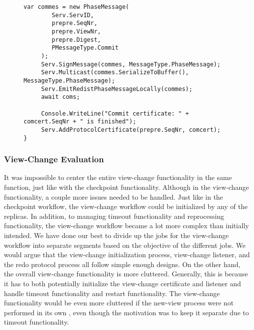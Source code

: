 \begin{figure}[H]
\begin{lstlisting}[label = code:redoprotocol, caption=Redo Protocol Functionality, captionpos = b, basicstyle=\scriptsize]
     var commes = new PhaseMessage(
        Serv.ServID, 
        prepre.SeqNr, 
        prepre.ViewNr, 
        prepre.Digest, 
        PMessageType.Commit
     );
     Serv.SignMessage(commes, MessageType.PhaseMessage);
     Serv.Multicast(commes.SerializeToBuffer(), MessageType.PhaseMessage);
     Serv.EmitRedistPhaseMessageLocally(commes);
     await coms;
     
     Console.WriteLine("Commit certificate: " + comcert.SeqNr + " is finished");
     Serv.AddProtocolCertificate(prepre.SeqNr, comcert);
}
	\end{lstlisting}
\end{figure}

\subsubsection{View-Change Evaluation}
It was impossible to center the entire view-change functionality in the same function, just like with the checkpoint functionality. Although in the view-change functionality, a couple more issues needed to be handled. Just like in the checkpoint workflow, the view-change workflow could be initialized by any of the replicas. In addition, to managing timeout functionality and reprocessing functionality, the view-change workflow became a lot more complex than initially intended. We have done our best to divide up the jobs for the view-change workflow into separate segments based on the objective of the different jobs.  We would argue that the view-change initialization process, view-change listener, and the redo protocol process all follow simple enough designs.  On the other hand, the overall view-change functionality is more cluttered.  Generally, this is because it has to both potentially initialize the view-change certificate and listener and handle timeout functionality and restart functionality. The view-change functionality would be even more cluttered if the new-view process were not performed in its own , even though the motivation was to keep it separate due to timeout functionality. 

